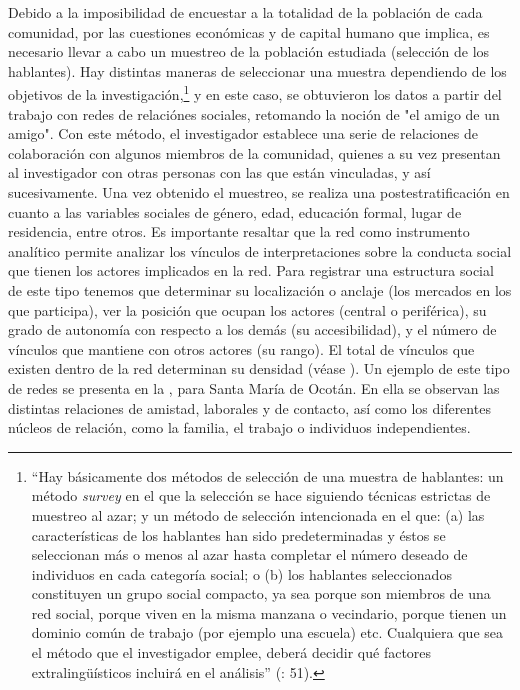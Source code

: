 \documentclass[output=paper]{../langscibook}
\begin{document}
Debido a la imposibilidad de encuestar a la totalidad de la población de cada comunidad, por las cuestiones económicas y de capital humano que implica, es necesario llevar a cabo un muestreo de la población estudiada (selección de los hablantes). Hay distintas maneras de seleccionar una muestra dependiendo de los objetivos de la investigación,\footnote{“Hay básicamente dos métodos de selección de una muestra de hablantes: un método \textit{survey} en el que la selección se hace siguiendo técnicas estrictas de muestreo al azar; y un método de selección intencionada en el que: (a) las características de los hablantes han sido predeterminadas y éstos se seleccionan más o menos al azar hasta completar el número deseado de individuos en cada categoría social; o (b) los hablantes seleccionados constituyen un grupo social compacto, ya sea porque son miembros de una red social, porque viven en la misma manzana o vecindario, porque tienen un dominio común de trabajo (por ejemplo una escuela) etc. Cualquiera que sea el método que el investigador emplee, deberá decidir qué factores extralingüísticos incluirá en el análisis” (\citealt{Silva-Corvalán2001}: 51).} y en este caso, se obtuvieron los datos a partir del trabajo con redes de relaciónes sociales, retomando la noción de "el amigo de un amigo". Con este método, el investigador establece una serie de relaciones de colaboración con algunos miembros de la comunidad, quienes a su vez presentan al investigador con otras personas con las que están vinculadas, y así sucesivamente. Una vez obtenido el muestreo, se realiza una postestratificación en cuanto a las variables sociales de género, edad, educación formal, lugar de residencia, entre otros. Es importante resaltar que la red como instrumento analítico permite analizar los vínculos de interpretaciones sobre la conducta social que tienen los actores implicados en la red. Para registrar una estructura social de este tipo tenemos que determinar su localización o anclaje (los mercados en los que participa), ver la posición que ocupan los actores (central o periférica), su grado de autonomía con respecto a los demás (su accesibilidad), y el número de vínculos que mantiene con otros actores (su rango). El total de vínculos que existen dentro de la red determinan su densidad (véase \citealt[137-138]{RequenaSantos1989}). Un ejemplo de este tipo de redes se presenta en la , para Santa María de Ocotán. En ella se observan las distintas relaciones de amistad, laborales y de contacto, así como los diferentes núcleos de relación, como la familia, el trabajo o individuos independientes.
\end{document}
